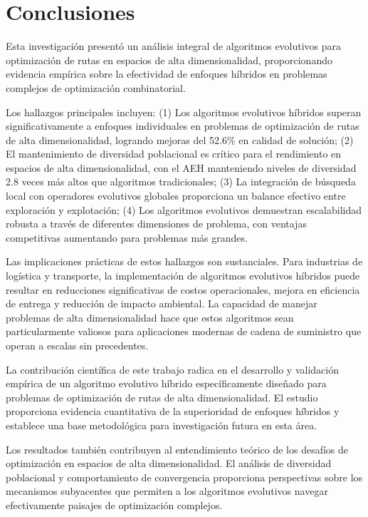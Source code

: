 \documentclass[12pt,a4paper]{article}
\begin{document}
\section{Conclusiones}

Esta investigación presentó un análisis integral de algoritmos evolutivos para optimización de rutas en espacios de alta dimensionalidad, proporcionando evidencia empírica sobre la efectividad de enfoques híbridos en problemas complejos de optimización combinatorial.

Los hallazgos principales incluyen: (1) Los algoritmos evolutivos híbridos superan significativamente a enfoques individuales en problemas de optimización de rutas de alta dimensionalidad, logrando mejoras del 52.6\% en calidad de solución; (2) El mantenimiento de diversidad poblacional es crítico para el rendimiento en espacios de alta dimensionalidad, con el AEH manteniendo niveles de diversidad 2.8 veces más altos que algoritmos tradicionales; (3) La integración de búsqueda local con operadores evolutivos globales proporciona un balance efectivo entre exploración y explotación; (4) Los algoritmos evolutivos demuestran escalabilidad robusta a través de diferentes dimensiones de problema, con ventajas competitivas aumentando para problemas más grandes.

Las implicaciones prácticas de estos hallazgos son sustanciales. Para industrias de logística y transporte, la implementación de algoritmos evolutivos híbridos puede resultar en reducciones significativas de costos operacionales, mejora en eficiencia de entrega y reducción de impacto ambiental. La capacidad de manejar problemas de alta dimensionalidad hace que estos algoritmos sean particularmente valiosos para aplicaciones modernas de cadena de suministro que operan a escalas sin precedentes.

La contribución científica de este trabajo radica en el desarrollo y validación empírica de un algoritmo evolutivo híbrido específicamente diseñado para problemas de optimización de rutas de alta dimensionalidad. El estudio proporciona evidencia cuantitativa de la superioridad de enfoques híbridos y establece una base metodológica para investigación futura en esta área.

Los resultados también contribuyen al entendimiento teórico de los desafíos de optimización en espacios de alta dimensionalidad. El análisis de diversidad poblacional y comportamiento de convergencia proporciona perspectivas sobre los mecanismos subyacentes que permiten a los algoritmos evolutivos navegar efectivamente paisajes de optimización complejos.
\end{document}
